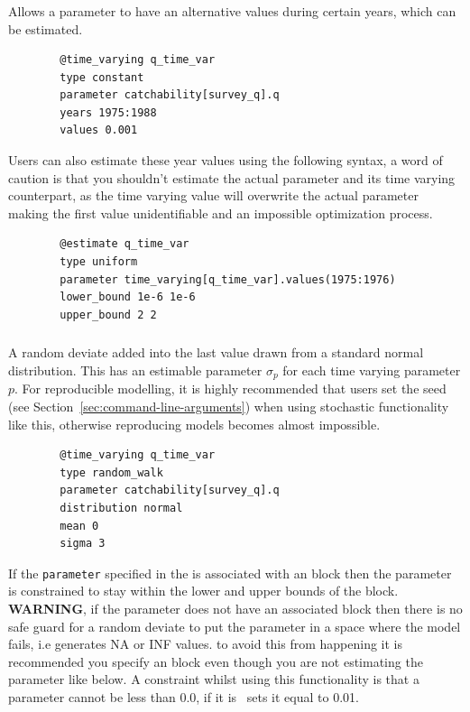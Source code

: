 \subsubsection[Constant]{}
Allows a parameter to have an alternative values during certain years, which can be estimated.
{\small{\begin{verbatim}
		@time_varying q_time_var
		type constant
		parameter catchability[survey_q].q
		years 1975:1988
		values 0.001
		\end{verbatim}}}

Users can also estimate these year values using the following syntax, a word of caution is that you shouldn't estimate the actual parameter and its time varying counterpart, as the time varying value will overwrite the actual parameter making the first value unidentifiable and an impossible optimization process.
{\small{\begin{verbatim}
		@estimate q_time_var
		type uniform
		parameter time_varying[q_time_var].values(1975:1976)
		lower_bound 1e-6 1e-6
		upper_bound 2 2
		\end{verbatim}}}

\subsubsection[Random Walk]{}

A random deviate added into the last value drawn from a standard normal distribution. This has an estimable parameter $\sigma_p$ for each time varying parameter $p$. For reproducible modelling, it is highly recommended that users set the seed (see Section~\ref{sec:command-line-arguments}) when using stochastic functionality like this, otherwise reproducing models becomes almost impossible.
{\small{\begin{verbatim}
		@time_varying q_time_var
		type random_walk
		parameter catchability[survey_q].q
		distribution normal
		mean 0
		sigma 3
		\end{verbatim}}}

If the \texttt{parameter} specified in the  is associated with an  block then the parameter is constrained to stay within the lower and upper bounds of the  block. \textbf{WARNING}, if the parameter does not have an associated  block then there is no safe guard for a random deviate to put the parameter in a space where the model fails, i.e generates NA or INF values. to avoid this from happening it is recommended you specify an  block even though you are not estimating the parameter like below. A constraint whilst using this functionality is that a parameter cannot be less than 0.0, if it is \CNAME\ sets it equal to 0.01.

